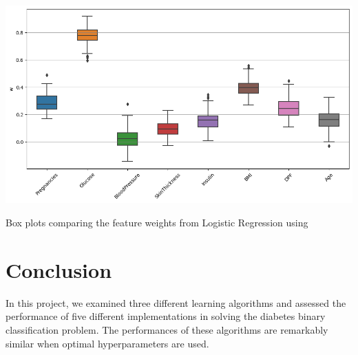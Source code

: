\documentclass[12pt]{article}
\begin{document}
\begin{center}
    \includegraphics[width=0.8\linewidth]{images/box - weights - logistic - shorter.png}
    
    \caption{Box plots comparing the feature weights from Logistic Regression using }
    
\end{center}

\vspace{-10pt}

    
    


    
    







\section{Conclusion}

In this project, we examined three different learning algorithms and assessed the performance of five different implementations in solving the diabetes binary classification problem. 
The performances of these algorithms are remarkably similar when optimal hyperparameters are used.
\end{document}
